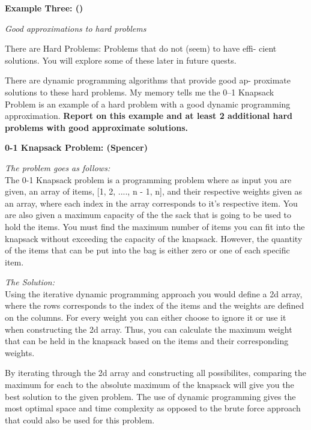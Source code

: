 \documentclass{article}
\begin{document}
\bigskip

\noindent \textbf{Example Three: ()}




\pagebreak

\noindent \textit{Good approximations to hard problems}

\medskip

There are Hard Problems: Problems that do not (seem) to have effi-
cient solutions. You will explore some of these later in future quests.

\medskip

There are dynamic programming algorithms that provide good ap-
proximate solutions to these hard problems. My memory tells me the
0–1 Knapsack Problem is an example of a hard problem with a good
dynamic programming approximation. \textbf{Report on this example and
at least 2 additional hard problems with good approximate solutions.}

\bigskip

\noindent \textbf{0-1 Knapsack Problem: (Spencer)} 

\noindent \textit{The problem goes as follows:} \\

The 0-1 Knapsack problem is a programming problem where as input you
are given, an array of items, [1, 2, ...., n - 1, n], and their 
respective weights given as an array, where each index in the array
corresponds to it's respective item. You are also given a maximum capacity
of the the sack that is going to be used to hold the items. You must find
the maximum number of items you can fit into the knapsack without exceeding
the capacity of the knapsack. However, the quantity of the items that can
be put into the bag is either zero or one of each specific item.

\medskip

\noindent \textit{The Solution:} \\

Using the iterative dynamic programming approach you would define a 2d array,
where the rows corresponds to the index of the items and the weights are defined
on the columns. For every weight you can either choose to ignore it or use it
when constructing the 2d array. Thus, you can calculate the maximum weight
that can be held in the knapsack based on the items and their corresponding
weights.

By iterating through the 2d array and constructing all possibilites, comparing
the maximum for each to the absolute maximum of the knapsack will give you 
the best solution to the given problem. The use of dynamic programming gives
the most optimal space and time complexity as opposed to the brute force
approach that could also be used for this problem.
\end{document}
